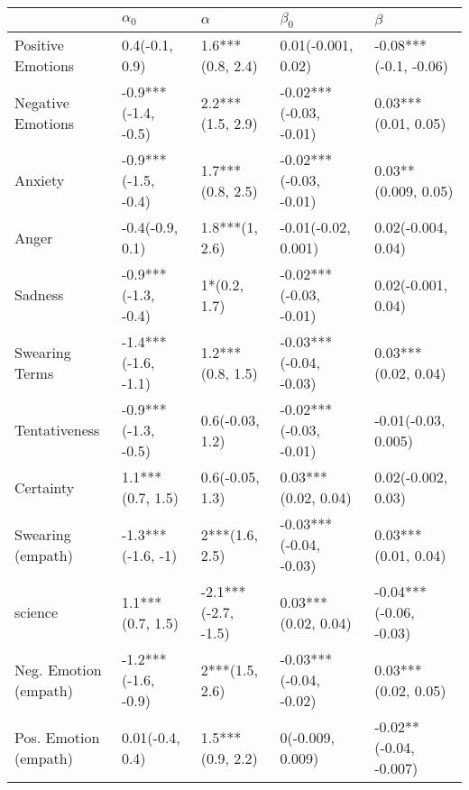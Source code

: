 \begin{tabular}{lllll}
\toprule
{} &           $\alpha_0$ &             $\alpha$ &               $\beta_0$ &                 $\beta$ \\
\midrule
Positive Emotions     &       0.4(-0.1, 0.9) &     1.6***(0.8, 2.4) &      0.01(-0.001, 0.02) &   -0.08***(-0.1, -0.06) \\
Negative Emotions     &  -0.9***(-1.4, -0.5) &     2.2***(1.5, 2.9) &  -0.02***(-0.03, -0.01) &     0.03***(0.01, 0.05) \\
Anxiety               &  -0.9***(-1.5, -0.4) &     1.7***(0.8, 2.5) &  -0.02***(-0.03, -0.01) &     0.03**(0.009, 0.05) \\
Anger                 &      -0.4(-0.9, 0.1) &       1.8***(1, 2.6) &     -0.01(-0.02, 0.001) &      0.02(-0.004, 0.04) \\
Sadness               &  -0.9***(-1.3, -0.4) &         1*(0.2, 1.7) &  -0.02***(-0.03, -0.01) &      0.02(-0.001, 0.04) \\
Swearing Terms        &  -1.4***(-1.6, -1.1) &     1.2***(0.8, 1.5) &  -0.03***(-0.04, -0.03) &     0.03***(0.02, 0.04) \\
Tentativeness         &  -0.9***(-1.3, -0.5) &      0.6(-0.03, 1.2) &  -0.02***(-0.03, -0.01) &     -0.01(-0.03, 0.005) \\
Certainty             &     1.1***(0.7, 1.5) &      0.6(-0.05, 1.3) &     0.03***(0.02, 0.04) &      0.02(-0.002, 0.03) \\
Swearing (empath)     &    -1.3***(-1.6, -1) &       2***(1.6, 2.5) &  -0.03***(-0.04, -0.03) &     0.03***(0.01, 0.04) \\
science               &     1.1***(0.7, 1.5) &  -2.1***(-2.7, -1.5) &     0.03***(0.02, 0.04) &  -0.04***(-0.06, -0.03) \\
Neg. Emotion (empath) &  -1.2***(-1.6, -0.9) &       2***(1.5, 2.6) &  -0.03***(-0.04, -0.02) &     0.03***(0.02, 0.05) \\
Pos. Emotion (empath) &      0.01(-0.4, 0.4) &     1.5***(0.9, 2.2) &        0(-0.009, 0.009) &  -0.02**(-0.04, -0.007) \\
\bottomrule
\end{tabular}
